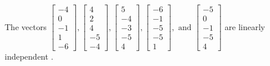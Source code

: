 \begin{exercise}
\begin{exerciseStatement}
  \end{exerciseStatement}
  \begin{exerciseAnswer}
   The vectors \(\left[\begin{array}{r}
-4 \\
0 \\
-1 \\
1 \\
-6
\end{array}\right] , \left[\begin{array}{r}
4 \\
2 \\
4 \\
-5 \\
-4
\end{array}\right] , \left[\begin{array}{r}
5 \\
-4 \\
-3 \\
-5 \\
4
\end{array}\right] , \left[\begin{array}{r}
-6 \\
-1 \\
-5 \\
-5 \\
1
\end{array}\right] , \text{ and } \left[\begin{array}{r}
-5 \\
0 \\
-1 \\
-5 \\
4
\end{array}\right]\) are 
  	 linearly independent  .
  


  \end{exerciseAnswer}
\end{exercise}